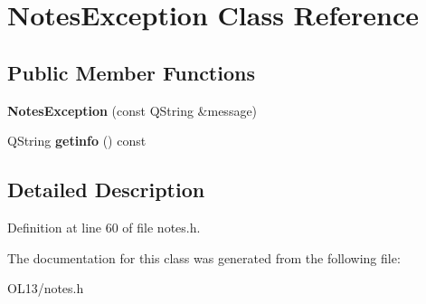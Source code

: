 \hypertarget{class_notes_exception}{}\section{Notes\+Exception Class Reference}
\label{class_notes_exception}
\subsection*{Public Member Functions}
\begin{DoxyCompactItemize}
\item 
\mbox{\label{class_notes_exception_af10aca61d1cb993b62e868f0fe9bf144}} 
{\bfseries Notes\+Exception} (const Q\+String \&message)
\item 
\mbox{\label{class_notes_exception_aaa70b4b237c0fcadf5426848b54da15e}} 
Q\+String {\bfseries getinfo} () const
\end{DoxyCompactItemize}


\subsection{Detailed Description}


Definition at line 60 of file notes.\+h.



The documentation for this class was generated from the following file\+:\begin{DoxyCompactItemize}
\item 
O\+L13/notes.\+h\end{DoxyCompactItemize}
